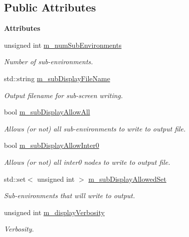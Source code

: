 \subsection*{Public Attributes}
\begin{Indent}{\bf Attributes}\par
\begin{DoxyCompactItemize}
\item 
unsigned int \hyperlink{class_q_u_e_s_o_1_1_env_options_values_a0a53bbc1544a519eb50faddcfae0cedd}{m\-\_\-num\-Sub\-Environments}
\begin{DoxyCompactList}\small\item\em Number of sub-\/environments. \end{DoxyCompactList}\item 
std\-::string \hyperlink{class_q_u_e_s_o_1_1_env_options_values_ae92ff6d68751d90fd6fbb7de98e66ef2}{m\-\_\-sub\-Display\-File\-Name}
\begin{DoxyCompactList}\small\item\em Output filename for sub-\/screen writing. \end{DoxyCompactList}\item 
bool \hyperlink{class_q_u_e_s_o_1_1_env_options_values_a942d62cb804c174e1de76cc776368924}{m\-\_\-sub\-Display\-Allow\-All}
\begin{DoxyCompactList}\small\item\em Allows (or not) all sub-\/environments to write to output file. \end{DoxyCompactList}\item 
bool \hyperlink{class_q_u_e_s_o_1_1_env_options_values_ae7b34ee974716034ae21a2c39891b8c3}{m\-\_\-sub\-Display\-Allow\-Inter0}
\begin{DoxyCompactList}\small\item\em Allows (or not) all inter0 nodes to write to output file. \end{DoxyCompactList}\item 
std\-::set$<$ unsigned int $>$ \hyperlink{class_q_u_e_s_o_1_1_env_options_values_afd2f167d8f568df84b3efe5df4430ee3}{m\-\_\-sub\-Display\-Allowed\-Set}
\begin{DoxyCompactList}\small\item\em Sub-\/environments that will write to output. \end{DoxyCompactList}\item 
unsigned int \hyperlink{class_q_u_e_s_o_1_1_env_options_values_aacf4ef43ac39a6118ca3e9bb7f0f8414}{m\-\_\-display\-Verbosity}
\begin{DoxyCompactList}\small\item\em Verbosity. \end{DoxyCompactList}\item 

\end{DoxyCompactItemize}
\end{Indent}
